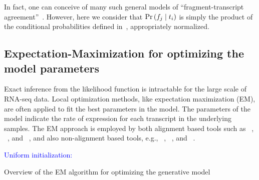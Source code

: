 In fact, one can conceive of many such general models of ``fragment-transcript
agreement''~\citep{Patro2017Salmon}. However, here we consider that 
$\Prob{f_j}{t_i}$ is simply the product of the conditional probabilities 
defined in~, appropriately 
normalized.


\subsection{Expectation-Maximization for optimizing the model parameters}
Exact inference from the likelihood function is intractable for the large 
scale of RNA-seq data. Local optimization methods, like expectation 
maximization (EM), are often applied to fit the best parameters in the model. 
The parameters of the model indicate the rate of expression for each transcript 
in the underlying samples. The EM approach is employed by both alignment based 
tools such as \rsem~\citep{Li2010RSEM}, \mmseq~\citep{Turro2011Haplotype}, and
\isoem~\citep{Nicolae2011Estimation}, and also non-alignment based tools, e.g., 
\sailfish~\citep{Patro2014Sailfish}, \salmon~\citep{Patro2017Salmon}, and 
\kallisto~\citep{Bray2016Kallisto}. 

\begin{algorithm}[H]
\SetAlgoLined
{}
\textcolor{blue}{Uniform initialization:}\\
\caption{Overview of the EM algorithm for optimizing the generative model}
 \label{EM-alg}
\end{algorithm}

